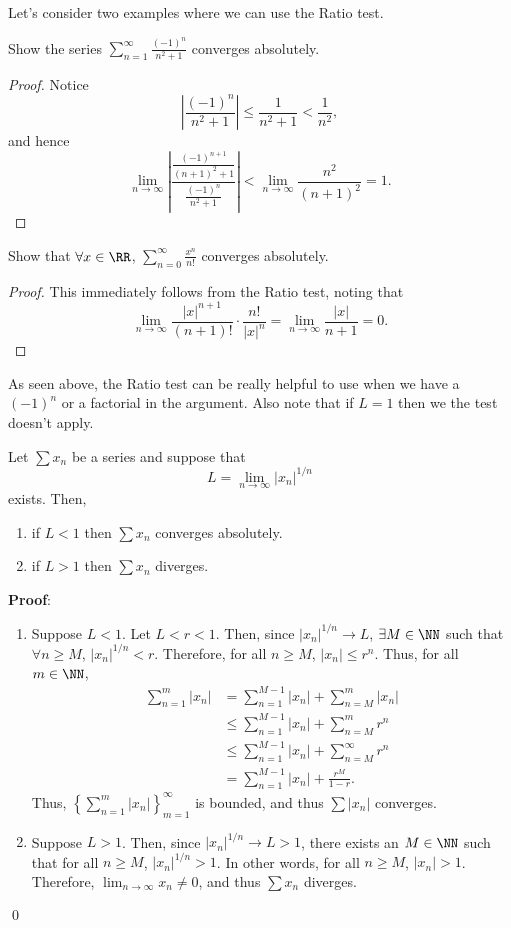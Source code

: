 Let's consider two examples where we can use the Ratio test.
\begin{example}
Show the series $\sum_{n=1}^\infty \frac{(-1)^n}{n^2 + 1}$ converges absolutely.
\end{example}
\begin{proof}
Notice
    \[
    \left|\frac{(-1)^n}{n^2+1}\right| \leq \frac{1}{n^2 + 1} < \frac{1}{n^2},
    \]
    and hence 
    \[
    \lim_{n\to \infty} \left|\frac{\frac{(-1)^{n+1}}{(n+1)^2+1}}{\frac{(-1)^{n}}{n^2+1}}\right| < \lim_{n\to \infty} \frac{n^2}{(n+1)^2} = 1.
    \]
\end{proof}

\begin{example}
Show that $\forall x\in \RR$, $\sum_{n=0}^\infty \frac{x^n}{n!}$ converges absolutely. 
\end{example}
\begin{proof}
This immediately follows from the Ratio test, noting that
    \[
    \lim_{n\to \infty} \frac{|x|^{n+1}}{(n+1)!} \cdot \frac{n!}{|x|^n} = \lim_{n\to \infty} \frac{|x|}{n+1} = 0.
    \]
\end{proof}

\begin{remark}
As seen above, the Ratio test can be really helpful to use when we have a $(-1)^n$ or a factorial in the argument. Also note that if $L = 1$ then we the test doesn't apply.
\end{remark}

\begin{theorem}
Let $\sum x_n$ be a series and suppose that 
\[
L = \lim_{n\to \infty} |x_n|^{1/n}
\]
exists. Then,
\begin{enumerate}
\item if $L<1$ then $\sum x_n$ converges absolutely. 
\item if $L>1$ then $\sum x_n$ diverges.
\end{enumerate}
\end{theorem}
\textbf{Proof}: 
\begin{enumerate}
    \item Suppose $L<1$. Let $L < r < 1$. Then, since $|x_n|^{1/n} \to L$,  $\exists M \in \NN$ such that $\forall n \geq M$, $|x_n|^{1/n} < r$. Therefore, for all $n\geq M$, $|x_n| \leq r^n$. Thus, for all $m\in \NN$,
\begin{align*}
    \sum_{n=1}^m |x_n| &= \sum_{n=1}^{M-1} |x_n| + \sum_{n=M}^m |x_n| \\
    &\leq \sum_{n=1}^{M-1} |x_n| + \sum_{n=M}^m r^n \\
    &\leq \sum_{n=1}^{M-1}|x_n| + \sum_{n=M}^\infty r^n \\
    &= \sum_{n=1}^{M-1} |x_n| + \frac{r^M}{1-r}.
\end{align*}
Thus, $\left\{\sum_{n=1}^m |x_n|\right\}_{m=1}^\infty$ is bounded, and thus $\sum |x_n|$ converges.

    \item Suppose $L>1$. Then, since $|x_n|^{1/n}\to L>1$, there exists an $M\in \NN$ such that for all $n\geq M$, $|x_n|^{1/n} >1$. In other words, for all $n\geq M$, $|x_n| >1$. Therefore, $\lim_{n\to \infty} x_n \neq 0$, and thus $\sum x_n$ diverges.
\end{enumerate}
\qed 

